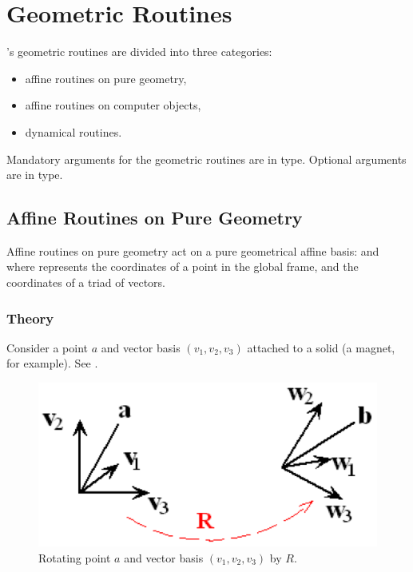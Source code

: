 
\chapter{Geometric Routines}
\label{cha:geometry}


%
\PTC's geometric routines are divided into three categories:
\begin{itemize}
  \item affine routines on pure geometry,
  \item affine routines on computer objects,
  \item dynamical routines.
\end{itemize}

Mandatory arguments for the geometric routines are in  type.  Optional arguments are in \ptc{\textit{\textcolor{red}{red
italic}}} type.


\section{Affine Routines on Pure Geometry}

%
Affine routines on pure geometry act on a pure geometrical affine basis:
 and  where  represents the coordinates of a
point in the global frame, and  the coordinates of a triad of vectors.


\subsection{Theory}
\label{sub:Theory-Affine-Routines}

%
Consider a point $a$ and vector basis $(v_1,v_2,v_3)$ attached
to a solid (a magnet, for example). See .

\begin{figure}[ht]
  \centering
  \includegraphics{illustrations/geo-routines-1}
  \caption{Rotating point $a$ and vector basis $(v_1,v_2,v_3)$ by $R$.}
  \label{fig:Rotating-point-a}
\end{figure}

